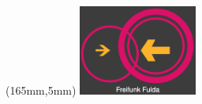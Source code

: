\documentclass[11pt, a4paper,ngerman]{article}
\begin{document}
\newpage
\begin{textblock*}{30mm}(165mm,5mm)
\includegraphics[height=30mm,width=39mm]{./FFLogo.png}\\
\end{textblock*}





\color{white}

% 

\end{document}
